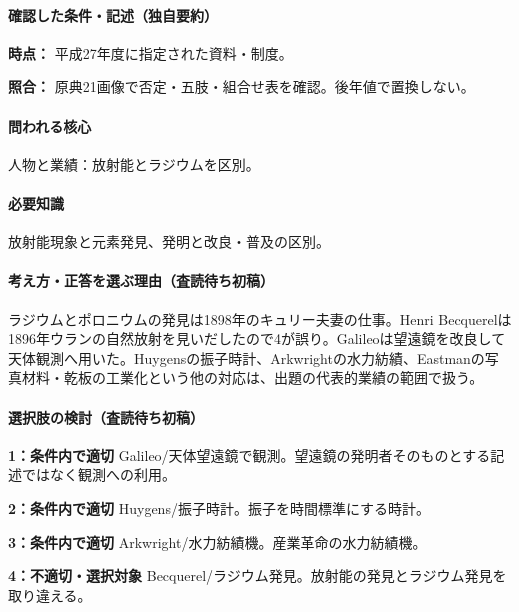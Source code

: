\paragraph{確認した条件・記述（独自要約）}\mbox{}\par

\noindent\textbf{時点：} 平成27年度に指定された資料・制度。\par

\noindent\textbf{照合：} 原典21画像で否定・五肢・組合せ表を確認。後年値で置換しない。\par

\paragraph{問われる核心} 人物と業績：放射能とラジウムを区別。

\paragraph{必要知識} 放射能現象と元素発見、発明と改良・普及の区別。

\paragraph{考え方・正答を選ぶ理由（査読待ち初稿）} ラジウムとポロニウムの発見は1898年のキュリー夫妻の仕事。Henri Becquerelは1896年ウランの自然放射を見いだしたので4が誤り。Galileoは望遠鏡を改良して天体観測へ用いた。Huygensの振子時計、Arkwrightの水力紡績、Eastmanの写真材料・乾板の工業化という他の対応は、出題の代表的業績の範囲で扱う。

\paragraph{選択肢の検討（査読待ち初稿）}\mbox{}\par

\noindent\textbf{1：条件内で適切} Galileo/天体望遠鏡で観測。望遠鏡の発明者そのものとする記述ではなく観測への利用。\par

\noindent\textbf{2：条件内で適切} Huygens/振子時計。振子を時間標準にする時計。\par

\noindent\textbf{3：条件内で適切} Arkwright/水力紡績機。産業革命の水力紡績機。\par

\noindent\textbf{4：不適切・選択対象} Becquerel/ラジウム発見。放射能の発見とラジウム発見を取り違える。\par

